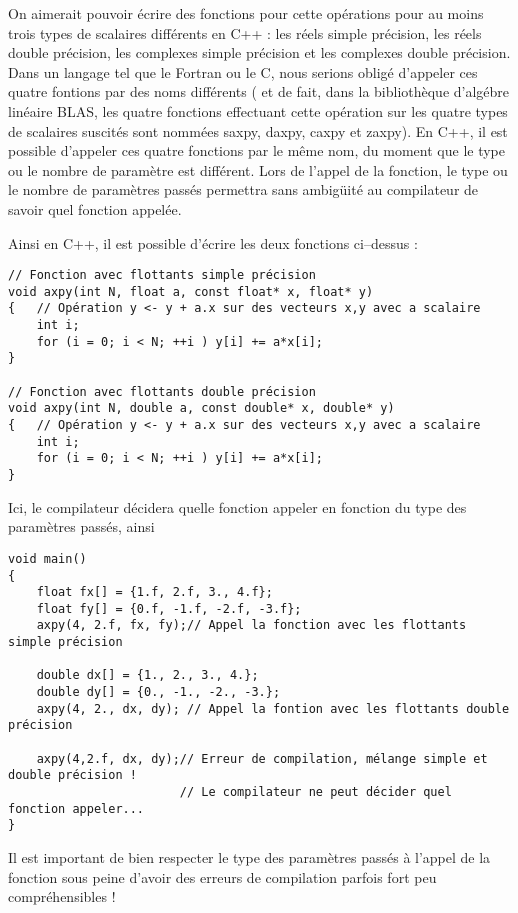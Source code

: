 \begin{itemize}
On aimerait pouvoir écrire des fonctions pour cette opérations pour au moins trois types de scalaires différents en C++ : les réels simple précision, les réels double précision, les complexes simple précision et les complexes double précision. Dans un langage tel que le Fortran ou le C, nous serions obligé d'appeler ces quatre fontions par des noms différents ( et de fait, dans la bibliothèque d'algébre linéaire BLAS, les quatre fonctions effectuant cette opération sur les quatre types de scalaires suscités sont nommées saxpy, daxpy, caxpy et zaxpy). En C++, il est possible d'appeler ces quatre fonctions par le même nom, du moment que le type ou le nombre de paramètre est différent. Lors de l'appel de la fonction, le type ou le nombre de paramètres passés permettra sans ambigüité au compilateur de savoir quel fonction appelée.

Ainsi en C++, il est possible d'écrire les deux fonctions ci--dessus :

\begin{lstlisting}[caption=Exemple de surcharge d'une fonction C++]
// Fonction avec flottants simple précision
void axpy(int N, float a, const float* x, float* y)
{   // Opération y <- y + a.x sur des vecteurs x,y avec a scalaire
    int i;
    for (i = 0; i < N; ++i ) y[i] += a*x[i];
}

// Fonction avec flottants double précision
void axpy(int N, double a, const double* x, double* y)
{   // Opération y <- y + a.x sur des vecteurs x,y avec a scalaire
    int i;
    for (i = 0; i < N; ++i ) y[i] += a*x[i];
}
\end{lstlisting}

Ici, le compilateur décidera quelle fonction appeler en fonction du type des paramètres passés, ainsi
\begin{lstlisting}[caption=Appel à des fonctions surchargées]
void main()
{
    float fx[] = {1.f, 2.f, 3., 4.f};
    float fy[] = {0.f, -1.f, -2.f, -3.f};
    axpy(4, 2.f, fx, fy);// Appel la fonction avec les flottants simple précision

    double dx[] = {1., 2., 3., 4.};
    double dy[] = {0., -1., -2., -3.};
    axpy(4, 2., dx, dy); // Appel la fontion avec les flottants double précision

    axpy(4,2.f, dx, dy);// Erreur de compilation, mélange simple et double précision !
                        // Le compilateur ne peut décider quel fonction appeler...
}
\end{lstlisting}

Il est important de bien respecter le type des paramètres passés à l'appel de la fonction sous peine d'avoir des erreurs de compilation parfois fort peu compréhensibles !


\end{itemize}
